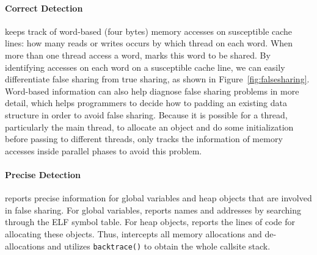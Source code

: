 \paragraph{Correct Detection} \Cheetah{} keeps track of word-based (four bytes) memory accesses on susceptible cache lines: how many reads or writes occurs by which thread on each word. When more than one thread access a word, \Cheetah{} marks this word to be shared. By identifying accesses on each word on a susceptible cache line, we can easily differentiate false sharing from true sharing, as shown in Figure~\ref{fig:falsesharing}. Word-based information can also help diagnose false sharing problems in more detail, which helps programmers to decide how to padding an existing data structure in order to avoid false sharing. Because it is possible for a thread, particularly the main thread, to allocate an object and do some initialization before passing to different threads,  \cheetah{} only tracks the information of memory accesses inside parallel phases to avoid this problem.

\paragraph{Precise Detection} \Cheetah{} reports precise information for global variables and heap objects that are involved in false sharing. For global variables, \Cheetah{} reports names and addresses by searching through the ELF symbol table. For heap objects, \Cheetah{} reports the lines of code for allocating these objects.  
Thus, \Cheetah{} intercepts all memory allocations and de-allocations and utilizes \texttt{backtrace()} to obtain the whole callsite stack. 

 
